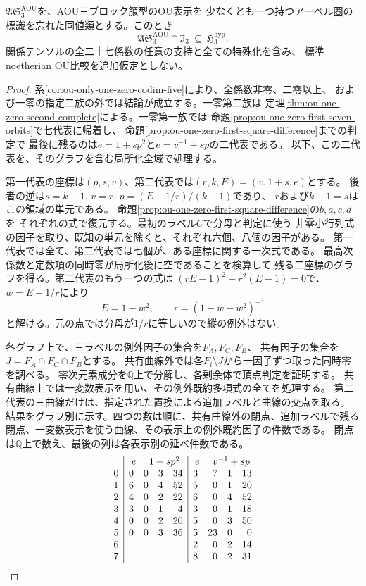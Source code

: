 \begin{theorem}[AOU三ブロック箙型の全係数における包含]
\label{thm:ou-aou-all-unconditional}
$\mathfrak{AS}^{\mathrm{AOU}}_3$を、AOU三ブロック箙型のOU表示を
少なくとも一つ持つアーベル圏の標識を忘れた同値類とする。このとき
\[
  \mathfrak{AS}^{\mathrm{AOU}}_3\cap\mathfrak I_3
                  \ \subseteq\ \mathfrak H^{\mathrm{hyp}}_3 .
\]
関係テンソルの全二十七係数の任意の支持と全ての特殊化を含み、
標準noetherian OU比較を追加仮定としない。
\end{theorem}
\begin{proof}
系\ref{cor:ou-only-one-zero-codim-five}により、全係数非零、二零以上、
および一零の指定二族の外では結論が成立する。一零第二族は
定理\ref{thm:ou-one-zero-second-complete}による。一零第一族では
命題\ref{prop:ou-one-zero-first-seven-orbits}で七代表に帰着し、
命題\ref{prop:ou-one-zero-first-square-difference}までの判定で
最後に残るのは$e=1+sp^2$と$e=v^{-1}+sp$の二代表である。
以下、この二代表を、そのグラフを含む局所化全域で処理する。

第一代表の座標は$(p,s,v)$、第二代表では$(r,k,E)=(v,1+s,e)$とする。
後者の逆は$s=k-1$, $v=r$, $p=(E-1/r)/(k-1)$であり、
$r$および$k-1=s$はこの領域の単元である。
命題\ref{prop:ou-one-zero-first-square-difference}の$b,a,c,d$を
それぞれの式で復元する。最初のラベル$C$で分母と判定に使う
非零小行列式の因子を取り、既知の単元を除くと、それぞれ六個、八個の因子がある。
第一代表では全て、第二代表では七個が、ある座標に関する一次式である。
最高次係数と定数項の同時零が局所化後に空であることを検算して
残る二座標のグラフを得る。第二代表のもう一つの式は
$(rE-1)^2+r^2(E-1)=0$で、$w=E-1/r$により
\[
 E=1-w^2,\qquad r=(1-w-w^2)^{-1}
\]
と解ける。元の点では分母が$1/r$に等しいので縦の例外はない。

各グラフ上で、三ラベルの例外因子の集合を$F_A,F_C,F_B$、
共有因子の集合を$J=F_A\cap F_C\cap F_B$とする。
共有曲線外では各$F_i\setminus J$から一因子ずつ取った同時零を調べる。
零次元素成分を$\mathbb Q$上で分解し、各剰余体で頂点判定を証明する。
共有曲線上では一変数表示を用い、その例外既約多項式の全てを処理する。
第二代表の三曲線だけは、指定された置換による追加ラベルと曲線の交点を取る。
結果をグラフ別に示す。四つの数は順に、共有曲線外の閉点、追加ラベルで残る
閉点、一変数表示を使う曲線、その表示上の例外既約因子の件数である。
閉点は$\mathbb Q$上で数え、最後の列は各表示別の延べ件数である。
\[
\begin{array}{c|rrrr|rrrr}
 &\multicolumn{4}{c|}{e=1+sp^2}&\multicolumn{4}{c}{e=v^{-1}+sp}\\
0&0&0&3&34&3&7&1&13\\
1&6&0&4&52&5&0&1&20\\
2&4&0&2&22&6&0&4&52\\
3&3&0&1&4&3&0&1&18\\
4&0&0&2&20&5&0&3&50\\
5&0&0&3&36&5&23&0&0\\
6& & & & &2&0&2&14\\
7& & & & &8&0&2&31
\end{array}
\]


\end{proof}
